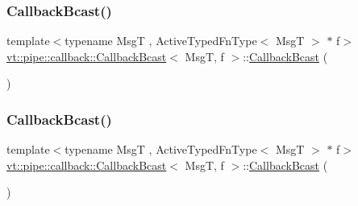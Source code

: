 \subsubsection{\texorpdfstring{Callback\+Bcast()}{CallbackBcast()}\hspace{0.1cm}{\footnotesize\ttfamily [2/5]}}
{\footnotesize\ttfamily template$<$typename MsgT , Active\+Typed\+Fn\+Type$<$ Msg\+T $>$ $\ast$ f$>$ \\
\hyperlink{structvt_1_1pipe_1_1callback_1_1_callback_bcast}{vt\+::pipe\+::callback\+::\+Callback\+Bcast}$<$ MsgT, f $>$\+::\hyperlink{structvt_1_1pipe_1_1callback_1_1_callback_bcast}{Callback\+Bcast} (\begin{DoxyParamCaption}{ }\end{DoxyParamCaption})\hspace{0.3cm}{\ttfamily [default]}}

\mbox{\label{structvt_1_1pipe_1_1callback_1_1_callback_bcast_a7a711d532fcf9c8c91ab984e9848e2f0}} 
\subsubsection{\texorpdfstring{Callback\+Bcast()}{CallbackBcast()}\hspace{0.1cm}{\footnotesize\ttfamily [3/5]}}
{\footnotesize\ttfamily template$<$typename MsgT , Active\+Typed\+Fn\+Type$<$ Msg\+T $>$ $\ast$ f$>$ \\
\hyperlink{structvt_1_1pipe_1_1callback_1_1_callback_bcast}{vt\+::pipe\+::callback\+::\+Callback\+Bcast}$<$ MsgT, f $>$\+::\hyperlink{structvt_1_1pipe_1_1callback_1_1_callback_bcast}{Callback\+Bcast} (\begin{DoxyParamCaption}\item[{\hyperlink{structvt_1_1pipe_1_1callback_1_1_callback_bcast}{Callback\+Bcast}$<$ MsgT, f $>$ const \&}]{ }\end{DoxyParamCaption})\hspace{0.3cm}{\ttfamily [default]}}

\mbox{\label{structvt_1_1pipe_1_1callback_1_1_callback_bcast_af90721bd868d3d3e4140db4bee5da39f}} 
